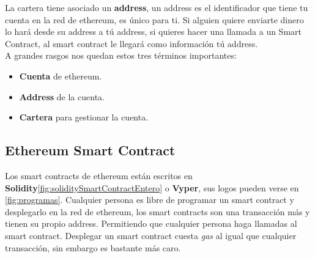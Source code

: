 La cartera tiene asociado un \textbf{address}, un address es el identificador que tiene tu cuenta en la red de ethereum, es único para ti. Si alguien quiere enviarte dinero lo hará desde su address a tú address, si quieres hacer una llamada a un Smart Contract, al smart contract le llegará como información tú address. \\

A grandes rasgos nos quedan estos tres términos importantes:
\begin{itemize}
\item \textbf{Cuenta} de ethereum.
\item \textbf{Address} de la cuenta.
\item \textbf{Cartera} para gestionar la cuenta.
\end{itemize}

\subsection{Ethereum Smart Contract}

Los smart contracts de ethereum están escritos en \textbf{Solidity}\cite{SolidityDocs}\ref{fig:soliditySmartContractEntero} o \textbf{Vyper}\cite{VyperDocs}, sus logos pueden verse en \ref{fig:programas}. Cualquier persona es libre de programar un smart contract y desplegarlo en la red de ethereum, los smart contracts son una transacción más y tienen su propio address. Permitiendo que cualquier persona haga llamadas al smart contract. Desplegar un smart contract cuesta \emph{gas} al igual que cualquier transacción, sin embargo es bastante más caro. 


